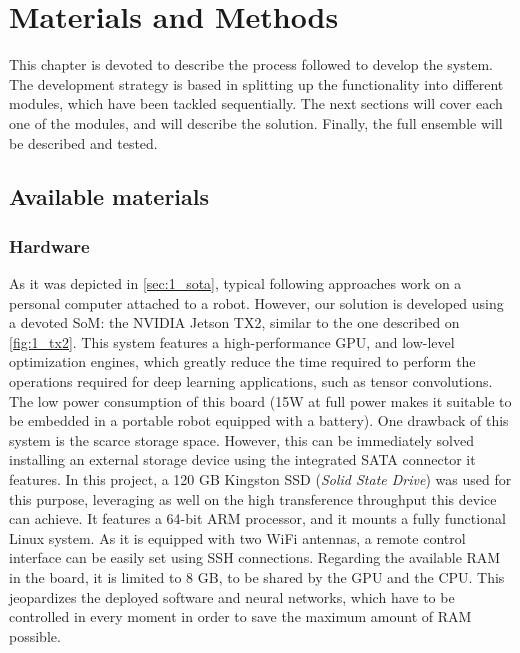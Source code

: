 \chapter{Materials and Methods}
\label{chap:2_materials_methods}
This chapter is devoted to describe the process followed to develop the system. The development strategy is based in splitting up the functionality into different modules, which have been tackled sequentially. The next sections will cover each one of the modules, and will describe the solution. Finally, the full ensemble will be described and tested.\\


\section{Available materials}
\label{sec:2_materials}
\subsection{Hardware}

As it was depicted in \autoref{sec:1_sota}, typical following approaches work on a personal computer attached to a robot. However, our solution is developed using a devoted SoM: the NVIDIA Jetson TX2, similar to the one described on \autoref{fig:1_tx2}. This system features a high-performance GPU, and low-level optimization engines, which greatly reduce the time required to perform the operations required for deep learning applications, such as tensor convolutions. The low power consumption of this board (15W at full power makes it suitable to be embedded in a portable robot equipped with a battery). One drawback of this system is the scarce storage space. However, this can be immediately solved installing an external storage device using the integrated SATA connector it features. In this project, a 120 GB Kingston SSD (\textit{Solid State Drive}) was used for this purpose, leveraging as well on the high transference throughput this device can achieve. It features a 64-bit ARM processor, and it mounts a fully functional Linux system. As it is equipped with two WiFi antennas, a remote control interface can be easily set using SSH connections. Regarding the available RAM in the board, it is limited to 8 GB, to be shared by the GPU and the CPU. This jeopardizes the deployed software and neural networks, which have to be controlled in every moment in order to save the maximum amount of RAM possible.\\

